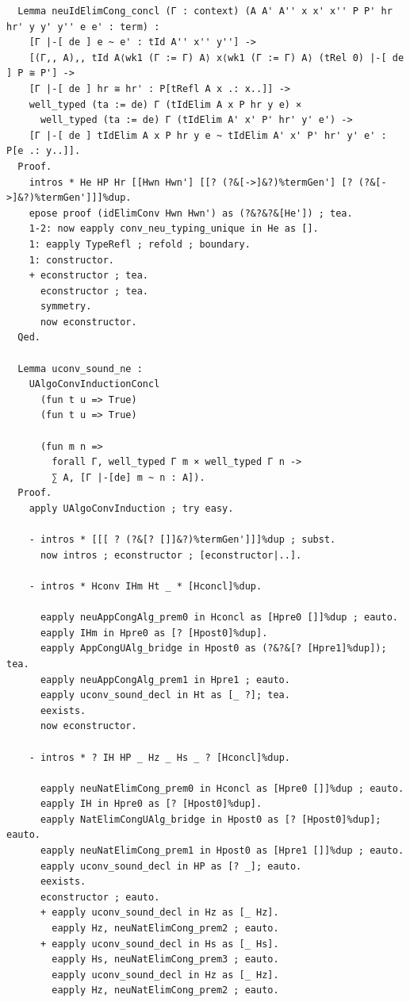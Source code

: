 \begin{lstlisting}
  Lemma neuIdElimCong_concl (Γ : context) (A A' A'' x x' x'' P P' hr hr' y y' y'' e e' : term) :
    [Γ |-[ de ] e ~ e' : tId A'' x'' y''] ->
    [(Γ,, A),, tId A⟨wk1 (Γ := Γ) A⟩ x⟨wk1 (Γ := Γ) A⟩ (tRel 0) |-[ de ] P ≅ P'] ->
    [Γ |-[ de ] hr ≅ hr' : P[tRefl A x .: x..]] ->
    well_typed (ta := de) Γ (tIdElim A x P hr y e) ×
      well_typed (ta := de) Γ (tIdElim A' x' P' hr' y' e') ->
    [Γ |-[ de ] tIdElim A x P hr y e ~ tIdElim A' x' P' hr' y' e' : P[e .: y..]].
  Proof.
    intros * He HP Hr [[Hwn Hwn'] [[? (?&[->]&?)%termGen'] [? (?&[->]&?)%termGen']]]%dup.
    epose proof (idElimConv Hwn Hwn') as (?&?&?&[He']) ; tea.
    1-2: now eapply conv_neu_typing_unique in He as [].
    1: eapply TypeRefl ; refold ; boundary.
    1: constructor.
    + econstructor ; tea.
      econstructor ; tea.
      symmetry.
      now econstructor.
  Qed.

  Lemma uconv_sound_ne :
    UAlgoConvInductionConcl
      (fun t u => True)
      (fun t u => True)

      (fun m n =>
        forall Γ, well_typed Γ m × well_typed Γ n ->
        ∑ A, [Γ |-[de] m ~ n : A]).
  Proof.
    apply UAlgoConvInduction ; try easy.
    
    - intros * [[[ ? (?&[? []]&?)%termGen']]]%dup ; subst.
      now intros ; econstructor ; [econstructor|..].

    - intros * Hconv IHm Ht _ * [Hconcl]%dup.

      eapply neuAppCongAlg_prem0 in Hconcl as [Hpre0 []]%dup ; eauto.
      eapply IHm in Hpre0 as [? [Hpost0]%dup].
      eapply AppCongUAlg_bridge in Hpost0 as (?&?&[? [Hpre1]%dup]); tea.
      eapply neuAppCongAlg_prem1 in Hpre1 ; eauto.
      eapply uconv_sound_decl in Ht as [_ ?]; tea.
      eexists.
      now econstructor.

    - intros * ? IH HP _ Hz _ Hs _ ? [Hconcl]%dup.

      eapply neuNatElimCong_prem0 in Hconcl as [Hpre0 []]%dup ; eauto.
      eapply IH in Hpre0 as [? [Hpost0]%dup].
      eapply NatElimCongUAlg_bridge in Hpost0 as [? [Hpost0]%dup]; eauto.
      eapply neuNatElimCong_prem1 in Hpost0 as [Hpre1 []]%dup ; eauto.
      eapply uconv_sound_decl in HP as [? _]; eauto.
      eexists.
      econstructor ; eauto.
      + eapply uconv_sound_decl in Hz as [_ Hz].
        eapply Hz, neuNatElimCong_prem2 ; eauto.
      + eapply uconv_sound_decl in Hs as [_ Hs].
        eapply Hs, neuNatElimCong_prem3 ; eauto.
        eapply uconv_sound_decl in Hz as [_ Hz].
        eapply Hz, neuNatElimCong_prem2 ; eauto.


\end{lstlisting}
